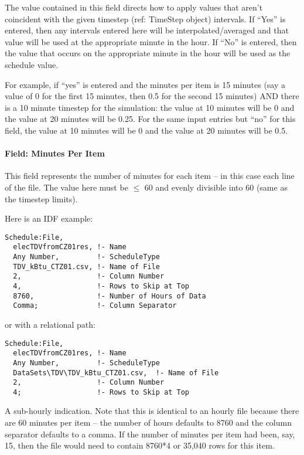 The value contained in this field directs how to apply values that aren't coincident with the given timestep (ref: TimeStep object) intervals. If ``Yes'' is entered, then any intervals entered here will be interpolated/averaged and that value will be used at the appropriate minute in the hour. If ``No'' is entered, then the value that occurs on the appropriate minute in the hour will be used as the schedule value.

For example, if ``yes'' is entered and the minutes per item is 15 minutes (say a value of 0 for the first 15 minutes, then 0.5 for the second 15 minutes) AND there is a 10 minute timestep for the simulation: the value at 10 minutes will be 0 and the value at 20 minutes will be 0.25. For the same input entries but ``no'' for this field, the value at 10 minutes will be 0 and the value at 20 minutes will be 0.5.

\paragraph{Field: Minutes Per Item}\label{field-minutes-per-item-1}

This field represents the number of minutes for each item -- in this case each line of the file. The value here must be \(\le\) 60 and evenly divisible into 60 (same as the timestep limits).

Here is an IDF example:

\begin{lstlisting}
Schedule:File,
  elecTDVfromCZ01res, !- Name
  Any Number,         !- ScheduleType
  TDV_kBtu_CTZ01.csv, !- Name of File
  2,                  !- Column Number
  4,                  !- Rows to Skip at Top
  8760,               !- Number of Hours of Data
  Comma;              !- Column Separator
\end{lstlisting}

or with a relational path:

\begin{lstlisting}
Schedule:File,
  elecTDVfromCZ01res, !- Name
  Any Number,         !- ScheduleType
  DataSets\TDV\TDV_kBtu_CTZ01.csv,  !- Name of File
  2,                  !- Column Number
  4;                  !- Rows to Skip at Top
\end{lstlisting}

A sub-hourly indication. Note that this is identical to an hourly file because there are 60 minutes per item -- the number of hours defaults to 8760 and the column separator defaults to a comma. If the number of minutes per item had been, say, 15, then the file would need to contain 8760*4 or 35,040 rows for this item.

